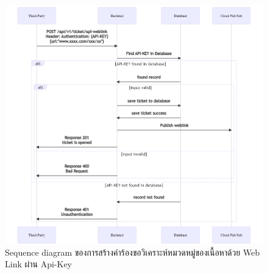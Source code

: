 \documentclass[12pt,oneside,openright,a4paper]{cpe-thai-project}
\begin{document}
\begin{figure}[!ht]\centering
  \includegraphics[width=\textwidth]{./img/seq_linkapi.png}
  \caption{Sequence diagram ของการสร้างคำร้องขอวิเคราะห์หมวดหมู่ของเนื้อหาด้วย Web Link ผ่าน Api-Key}\label{fig:seq_weblink_api} 
\end{figure} 
\end{document}

